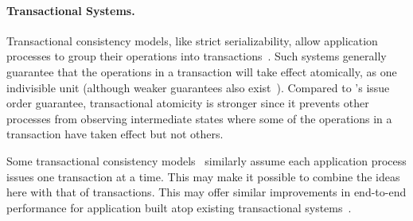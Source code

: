 \paragraph{Transactional Systems.}
Transactional consistency models, like strict serializability,
allow application processes to group their operations into
transactions~\cite{papadimitriou1979serializability}. Such
systems generally guarantee that the operations in a transaction
will take effect atomically, as one indivisible unit (although weaker 
guarantees also exist~\cite{adya1999weakcons}).
Compared to \MDL{}'s issue order guarantee, transactional atomicity 
is stronger since it prevents other processes from observing 
intermediate states where some of the operations in a transaction 
have taken effect but not others. 


Some transactional consistency
models~\cite{papadimitriou1979serializability,adya1999weakcons} similarly assume 
each application process issues one transaction at a time. This may 
make it possible to combine the ideas here with that of transactions. 
This may offer similar improvements in end-to-end 
performance for application built atop existing transactional 
systems~\cite{thomson2014calvin,mahmoud2013replicatedCommit,zhang2018tapir,mu2014rococo,mu2016janus,kraska2013mdcc,ren2019slog,taft2020crdb,yan2018carousel}.





